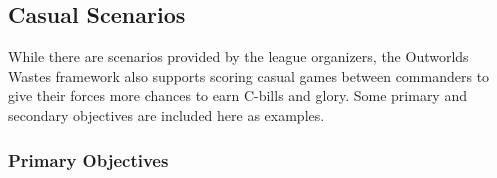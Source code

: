 \documentclass{article}
\begin{document}
\subsection{Casual Scenarios}

While there are scenarios provided by the league organizers, the Outworlds Wastes framework also supports scoring casual games between commanders to give their forces more chances to earn C-bills and glory.
Some primary and secondary objectives are included here as examples.

\subsubsection{Primary Objectives}
\end{document}
